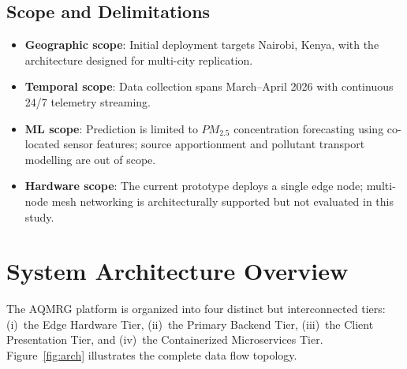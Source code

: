 \documentclass[12pt,a4paper]{article}
\begin{document}
\subsection{Scope and Delimitations}
\begin{itemize}[nosep]
    \item \textbf{Geographic scope}: Initial deployment targets Nairobi, Kenya, with the architecture designed for multi-city replication.
    \item \textbf{Temporal scope}: Data collection spans March--April 2026 with continuous 24/7 telemetry streaming.
    \item \textbf{ML scope}: Prediction is limited to $PM_{2.5}$ concentration forecasting using co-located sensor features; source apportionment and pollutant transport modelling are out of scope.
    \item \textbf{Hardware scope}: The current prototype deploys a single edge node; multi-node mesh networking is architecturally supported but not evaluated in this study.
\end{itemize}

\section{System Architecture Overview}

The AQMRG platform is organized into four distinct but interconnected tiers: (i)~the Edge Hardware Tier, (ii)~the Primary Backend Tier, (iii)~the Client Presentation Tier, and (iv)~the Containerized Microservices Tier. Figure~\ref{fig:arch} illustrates the complete data flow topology.
\end{document}
